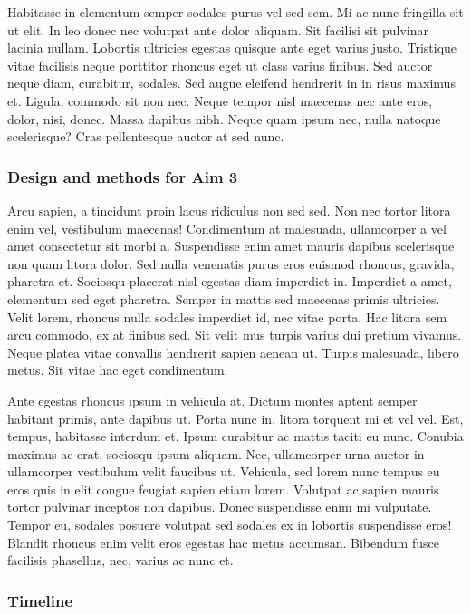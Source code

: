 \documentclass[11pt,]{article}
\begin{document}
Habitasse in elementum semper sodales purus vel sed sem. Mi ac nunc
fringilla sit ut elit. In leo donec nec volutpat ante dolor aliquam. Sit
facilisi sit pulvinar lacinia nullam. Lobortis ultricies egestas quisque
ante eget varius justo. Tristique vitae facilisis neque porttitor
rhoncus eget ut class varius finibus. Sed auctor neque diam, curabitur,
sodales. Sed augue eleifend hendrerit in in risus maximus et. Ligula,
commodo sit non nec. Neque tempor nisl maecenas nec ante eros, dolor,
nisi, donec. Massa dapibus nibh. Neque quam ipsum nec, nulla natoque
scelerisque? Cras pellentesque auctor at sed nunc.

\hypertarget{design-and-methods-for-aim-3}{%
\subsubsection{Design and methods for Aim
3}\label{design-and-methods-for-aim-3}}

Arcu sapien, a tincidunt proin lacus ridiculus non sed sed. Non nec
tortor litora enim vel, vestibulum maecenas! Condimentum at malesuada,
ullamcorper a vel amet consectetur sit morbi a. Suspendisse enim amet
mauris dapibus scelerisque non quam litora dolor. Sed nulla venenatis
purus eros euismod rhoncus, gravida, pharetra et. Sociosqu placerat nisl
egestas diam imperdiet in. Imperdiet a amet, elementum sed eget
pharetra. Semper in mattis sed maecenas primis ultricies. Velit lorem,
rhoncus nulla sodales imperdiet id, nec vitae porta. Hac litora sem arcu
commodo, ex at finibus sed. Sit velit mus turpis varius dui pretium
vivamus. Neque platea vitae convallis hendrerit sapien aenean ut. Turpis
malesuada, libero metus. Sit vitae hac eget condimentum.

Ante egestas rhoncus ipsum in vehicula at. Dictum montes aptent semper
habitant primis, ante dapibus ut. Porta nunc in, litora torquent mi et
vel vel. Est, tempus, habitasse interdum et. Ipsum curabitur ac mattis
taciti eu nunc. Conubia maximus ac erat, sociosqu ipsum aliquam. Nec,
ullamcorper urna auctor in ullamcorper vestibulum velit faucibus ut.
Vehicula, sed lorem nunc tempus eu eros quis in elit congue feugiat
sapien etiam lorem. Volutpat ac sapien mauris tortor pulvinar inceptos
non dapibus. Donec suspendisse enim mi vulputate. Tempor eu, sodales
posuere volutpat sed sodales ex in lobortis suspendisse eros! Blandit
rhoncus enim velit eros egestas hac metus accumsan. Bibendum fusce
facilisis phasellus, nec, varius ac nunc et.

\hypertarget{timeline}{%
\subsubsection{Timeline}\label{timeline}}
\end{document}
